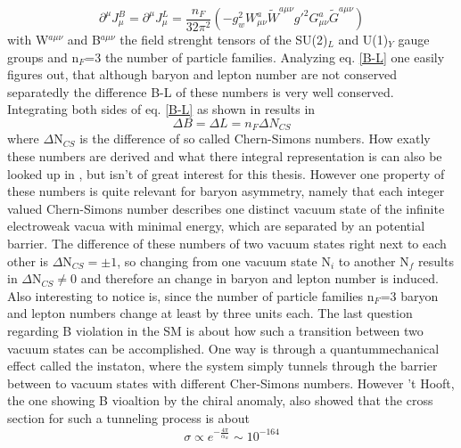 \begin{equation}
\partial^\mu J_\mu^B=\partial^\mu J_\mu^L=\frac{n_F}{32\pi^2}\left(-g_w^2W^a_{\mu\nu}\tilde{W}^{a\mu\nu}g'^2G^a_{\mu\nu}\tilde{G}^{a\mu\nu}\right)
\label{B-L}
\end{equation}
with W$^{a\mu\nu}$ and B$^{a\mu\nu}$ the field strenght tensors of the SU(2)$_L$ and U(1)$_Y$ gauge groups and n$_F$=3 the number of particle families. \newline
Analyzing eq. \ref{B-L} one easily figures out, that although baryon and lepton number are not conserved separatedly the difference B-L of these numbers is very well conserved.
Integrating both sides of eq. \ref{B-L} as shown in \cite[pp. 15f.]{Bernreuther:2002uj} results in 
\begin{equation}
	\Delta B=\Delta L=n_F\Delta N_{CS}
	\label{number_change}
\end{equation}
where $\Delta$N$_{CS}$ is the difference of so called Chern-Simons numbers. How exatly these numbers are derived and what there integral representation is can also be looked up in \cite{Bernreuther:2002uj,Cline:2006ts,Petropoulos:2003pm}, but isn't of great interest for this thesis. However one property of these numbers is quite relevant for baryon asymmetry, namely that each integer valued Chern-Simons number describes one distinct vacuum state of the infinite electroweak vacua with minimal energy, which are separated by an potential barrier. The difference of these numbers of two vacuum states right next to each other is $\Delta$N$_{CS}=\pm1$, so changing from one vacuum state N$_i$ to another N$_f$ results in $\Delta$N$_{CS}\neq0$ and therefore an change in baryon and lepton number is induced. Also interesting to notice is, since the number of particle families n$_F$=3 baryon and lepton numbers change at least by three units each. \newline
The last question regarding B violation in the SM is about how such a transition between two vacuum states can be accomplished. One way is through a quantummechanical effect called the instaton, where the system simply tunnels through the barrier between to vacuum states with different Cher-Simons numbers. However 't Hooft, the one showing B vioaltion by the chiral anomaly, also showed  \cite[Ref. 22,24]{Bernreuther:2002uj} that the cross section for such a tunneling process is about 
\begin{equation}
	\sigma\propto e^{-\frac{4\pi}{\alpha_w}}\sim10^{-164}
	\label{instaton_cross_section}
\end{equation}

